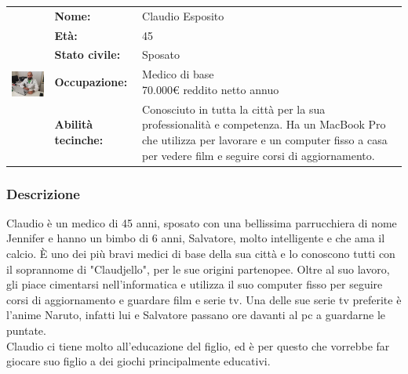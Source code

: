 \documentclass[../Report.tex]{subfiles}
\begin{document}
    \vspace{1.5cm}

    \begin{table}[H]
        \begin{tabular}{|c|l|p{7cm}|}
            \hline
            \multirow{5}{*}{\includegraphics[width=5cm, height=5cm]{Claudio.jpg}} 
                & \textbf{Nome:} & Claudio Esposito\\ \cmidrule{2-3}
            & \textbf{Età:} & 45 \\ \cmidrule{2-3}
            & \textbf{Stato civile:} & Sposato \\ \cmidrule{2-3}
            & \textbf{Occupazione:} & \makecell{Medico di base \\ 70.000€ reddito netto annuo} \\ \cmidrule{2-3}
            & \textbf{Abilità tecinche:} &  Conosciuto in tutta la città per la sua professionalità e competenza. Ha un MacBook Pro che utilizza per lavorare e un computer fisso a casa per vedere film e seguire corsi di aggiornamento.\\
            \hline
        \end{tabular}
    \end{table}

    \subsubsection{Descrizione}
    Claudio è un medico di 45 anni, sposato con una bellissima parrucchiera di nome Jennifer e hanno un bimbo di 6 anni, Salvatore, molto intelligente e che ama il calcio. È uno dei più bravi medici di base della sua città e lo conoscono tutti con il soprannome di "Claudjello", per le sue origini partenopee. Oltre al suo lavoro, gli piace cimentarsi nell'informatica e utilizza il suo computer fisso per seguire corsi di aggiornamento e guardare film e serie tv. Una delle sue serie tv preferite è l'anime Naruto, infatti lui e Salvatore passano ore davanti al pc a guardarne le puntate.\\
    Claudio ci tiene molto all'educazione del figlio, ed è per questo che vorrebbe far giocare suo figlio a dei giochi principalmente educativi.
\end{document}
